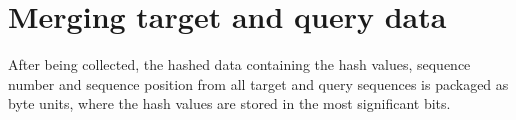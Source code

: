 \documentclass[twoside,a4paper,bsc]{master}
\newcommand{\Qgram}[1]{\(#1\)-gram}
\begin{document}

\section{Merging target and query data}
After being collected, the hashed data containing the hash values, sequence
number and sequence position from all target and query sequences
is packaged as byte units, where the hash values are stored in the most
significant bits.
\end{document}
